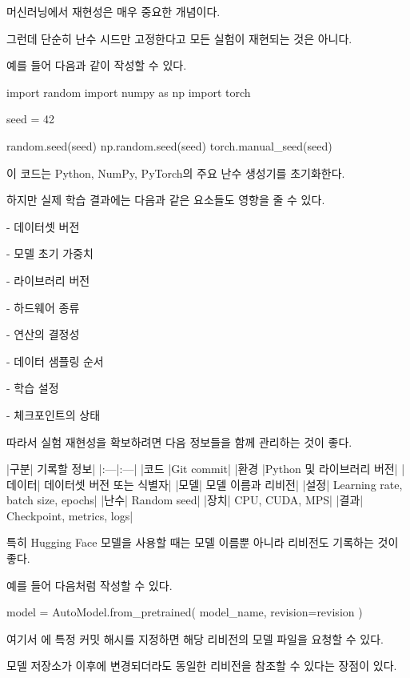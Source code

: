 머신러닝에서 재현성은 매우 중요한 개념이다.

그런데 단순히 난수 시드만 고정한다고 모든 실험이 재현되는 것은 아니다.

예를 들어 다음과 같이 작성할 수 있다.

\begin{dhkcode}
import random
import numpy as np
import torch

seed = 42

random.seed(seed)
np.random.seed(seed)
torch.manual_seed(seed)
\end{dhkcode}

이 코드는 Python, NumPy, PyTorch의 주요 난수 생성기를 초기화한다.

하지만 실제 학습 결과에는 다음과 같은 요소들도 영향을 줄 수 있다.

\begin{dhksmry}
    - 데이터셋 버전

    - 모델 초기 가중치

    - 라이브러리 버전

    - 하드웨어 종류

    - 연산의 결정성

    - 데이터 샘플링 순서

    - 학습 설정

    - 체크포인트의 상태
\end{dhksmry}

따라서 실험 재현성을 확보하려면 다음 정보들을 함께 관리하는 것이 좋다.

\begin{dhktable}
|구분|	기록할 정보|
|:---|:---|
|코드	|Git commit|
|환경	|Python 및 라이브러리 버전|
|데이터|	데이터셋 버전 또는 식별자|
|모델|	모델 이름과 리비전|
|설정|	Learning rate, batch size, epochs|
|난수|	Random seed|
|장치|	CPU, CUDA, MPS|
|결과|	Checkpoint, metrics, logs|
\end{dhktable}

특히 Hugging Face 모델을 사용할 때는 모델 이름뿐 아니라 리비전도 기록하는 것이 좋다.

예를 들어 다음처럼 작성할 수 있다.

\begin{dhkcode}
model = AutoModel.from_pretrained(
    model_name,
    revision=revision
)
\end{dhkcode}

여기서 에 특정 커밋 해시를 지정하면 해당 리비전의 모델 파일을 요청할 수 있다.

모델 저장소가 이후에 변경되더라도 동일한 리비전을 참조할 수 있다는 장점이 있다.

